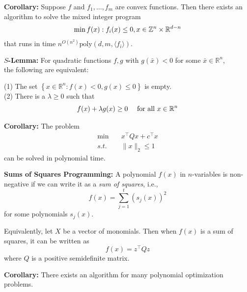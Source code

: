 \documentclass{article}
\begin{document}
\medskip
\medskip

\noindent \textbf{Corollary:}
Suppose $f$ and $f_1, \dots, f_m$ are convex functions.  Then there exists an algorithm to solve the mixed integer program 
$$
\min  f(x)  :   f_i(x) \leq 0, x \in {\mathbb{Z}}^n \times \mathbb{R}^{d-n}
$$
that runs in time $n^{O(n^2)} \textrm{poly}(d,m,\langle f_i \rangle)$.

\newpage

\noindent \textbf{ $S$-Lemma:}
For quadratic functions $f, g$ with $g(\bar{x})<0$ for some $\bar{x} \in \mathbb{R}^n$,\\
 the following are equivalent:  \smallskip

 \noindent (1) The set $\left\{x \in \mathbb{R}^n: f(x)<0, g(x) \leq 0\right\}$ is empty.\\
   (2) There is a $\lambda \geq 0$ such that 
$$f(x)+\lambda g(x) \geq 0 \quad \mbox{ for all  }x \in \mathbb{R}^n $$

\medskip
\medskip

\noindent \textbf{Corollary:} The problem 
\begin{equation}
\begin{split}
\min \quad   & x^\top Q x + c^\top x \\
s.t. \quad &   \|x\|_2 \leq 1
\end{split}
\end{equation}
can be solved in polynomial time.

\newpage

\textbf{Sums of Squares Programming:}  A polynomial $f(x)$ in $n$-variables is non-negative if we can write it as a \emph{sum of squares}, i.e., 
$$
f(x) = \sum_{j=1}^t (s_j(x))^2
$$
for some polynomials $s_j(x)$.  

Equivalently, let $X$ be a vector of monomials.  Then when $f(x)$ is a sum of squares, it can be written as 
$$
f(x) = z^\top Q z
$$
where $Q$ is a positive semidefinite matrix.

\medskip
\medskip
\noindent \textbf{Corollary:} There exists an algorithm for many polynomial optimization problems.
\end{document}
